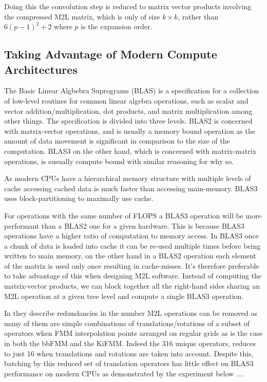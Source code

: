 \documentclass[12pt, a4, twoside]{article}
\begin{document}
Doing this the convolution step is reduced to matrix vector products involving the compressed M2L matrix, which is only of size $k \times k$, rather than $6(p-1)^2 + 2$ where $p$ is the expansion order.

\subsection{Taking Advantage of Modern Compute Architectures}

The Basic Linear Algbebra Suprograms (BLAS) is a specification for a collection of low-level routines for common linear algebra operations, such as scalar and vector addition/multiplication, dot products, and matrix multiplication among other things. The specification is divided into three levels. BLAS2 is concerned with matrix-vector operations, and is usually a memory bound operation as the amount of data movement is significant in comparison to the size of the computation. BLAS3 on the other hand, which is concerned with matrix-matrix operations, is susually compute bound with similar reasoning for why so.

As modern CPUs have a hierarchical memory structure with multiple levels of cache accessing cached data is much faster than accessing main-memory. BLAS3 uses block-partitioning to maximally use cache.

For operations with the same number of FLOPS a BLAS3 operation will be more performant than a BLAS2 one for a given hardware. This is because BLAS3 operations have a higher ratio of computation to memory access. In BLAS3 once a chunk of data is loaded into cache it can be re-used multiple times before being written to main memory, on the other hand in a BLAS2 operation each element of the matrix is used only once resulting in cache-misses. It's therefore preferable to take advantage of this when designing M2L software. Instead of computing the matrix-vector products, we can block together all the right-hand sides sharing an M2L operation at a given tree level and compute a single BLAS3 operation.

In \cite{Messner2012} they describe redundancies in the number M2L operations can be removed as many of them are simple combinations of translations/rotations of a subset of operators when FMM interpolation points arranged on regular grids as is the case in both the bbFMM and the KiFMM. Indeed the 316 unique operators, reduces to just 16 when translations and rotations are taken into account. Despite this, batching by this reduced set of translation operators has little effect on BLAS3 performance on modern CPUs as demonstrated by the experiment below ....
\end{document}
